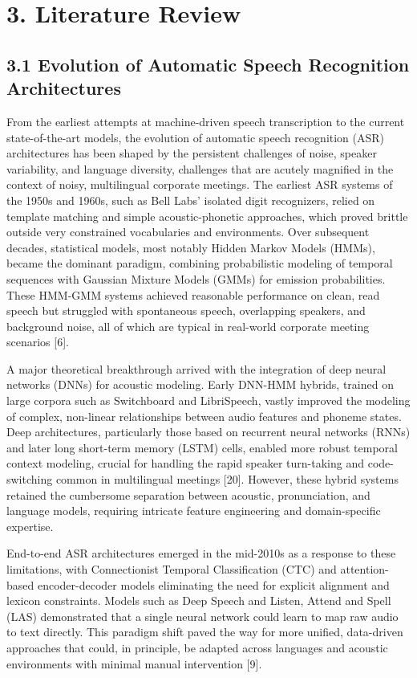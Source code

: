 \documentclass[12pt,a4paper]{article}
\begin{document}
\section{3. Literature Review}


\subsection{3.1 Evolution of Automatic Speech Recognition Architectures}


From the earliest attempts at machine-driven speech transcription to the current state-of-the-art models, the evolution of automatic speech recognition (ASR) architectures has been shaped by the persistent challenges of noise, speaker variability, and language diversity, challenges that are acutely magnified in the context of noisy, multilingual corporate meetings. The earliest ASR systems of the 1950s and 1960s, such as Bell Labs’ isolated digit recognizers, relied on template matching and simple acoustic-phonetic approaches, which proved brittle outside very constrained vocabularies and environments. Over subsequent decades, statistical models, most notably Hidden Markov Models (HMMs), became the dominant paradigm, combining probabilistic modeling of temporal sequences with Gaussian Mixture Models (GMMs) for emission probabilities. These HMM-GMM systems achieved reasonable performance on clean, read speech but struggled with spontaneous speech, overlapping speakers, and background noise, all of which are typical in real-world corporate meeting scenarios [6].


A major theoretical breakthrough arrived with the integration of deep neural networks (DNNs) for acoustic modeling. Early DNN-HMM hybrids, trained on large corpora such as Switchboard and LibriSpeech, vastly improved the modeling of complex, non-linear relationships between audio features and phoneme states. Deep architectures, particularly those based on recurrent neural networks (RNNs) and later long short-term memory (LSTM) cells, enabled more robust temporal context modeling, crucial for handling the rapid speaker turn-taking and code-switching common in multilingual meetings [20]. However, these hybrid systems retained the cumbersome separation between acoustic, pronunciation, and language models, requiring intricate feature engineering and domain-specific expertise.


End-to-end ASR architectures emerged in the mid-2010s as a response to these limitations, with Connectionist Temporal Classification (CTC) and attention-based encoder-decoder models eliminating the need for explicit alignment and lexicon constraints. Models such as Deep Speech and Listen, Attend and Spell (LAS) demonstrated that a single neural network could learn to map raw audio to text directly. This paradigm shift paved the way for more unified, data-driven approaches that could, in principle, be adapted across languages and acoustic environments with minimal manual intervention [9].
\end{document}
